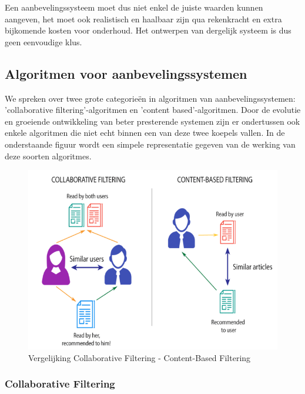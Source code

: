 Een aanbevelingssysteem moet dus niet enkel de juiste waarden kunnen aangeven, het moet ook realistisch en haalbaar zijn qua rekenkracht en extra bijkomende kosten voor onderhoud. Het ontwerpen van dergelijk systeem is dus geen eenvoudige klus.

\subsection{Algoritmen voor aanbevelingssystemen}
\label{sec:Algoritmen voor aanbevelingssystemen}

We spreken over twee grote categorieën in algoritmen van aanbevelingssystemen: 'collaborative filtering'-algoritmen en 'content based'-algoritmen.  \autocite{Adamovicius2005} Door de evolutie en groeiende ontwikkeling van beter presterende systemen zijn er ondertussen ook enkele algoritmen die niet echt binnen een van deze twee koepels vallen. In de onderstaande figuur wordt een simpele representatie gegeven van de werking van deze soorten algoritmes.

\begin{figure} [h!]
	\centering
	\includegraphics[width=\linewidth]{img/Content-based-filtering-and-Collaborative-filtering-recommendation}
	\caption[Vergelijking Collaborative Filtering - Content-Based Filtering]{Vergelijking Collaborative Filtering - Content-Based Filtering}
	\label{fig:CollaborativeVsContentBased}
\end{figure}
\newpage

	
\subsubsection{Collaborative Filtering}
\label{sec:Collaborative Filtering}

